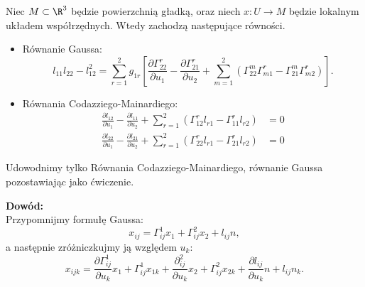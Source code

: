 \begin{frame}[<+->]


\begin{twierdzenie}\label{thm:Gauss-Codazz-Mainard}
Niec $M\subset \R^3$ będzie powierzchnią gładką, oraz niech $x\colon U\to M$ będzie lokalnym układem współrzędnych. Wtedy zachodzą następujące równości.
\begin{itemize}
\item Równanie Gaussa:
\begin{equation*}
l_{11}l_{22}-l_{12}^2=
\sum_{r=1}^{2}g_{1r}
\left[
\frac{\partial \Gamma^r_{22}} {\partial u_{1}}- \frac{\partial\Gamma ^r_{21}}{\partial u_{2}}+
\sum_{m=1}^2 \left(\Gamma^m_{22}\Gamma^r_{m1}-\Gamma^m_{21}\Gamma^r_{m2}\right)\right].
\end{equation*}

\item Równania Codazziego-Mainardiego:
\begin{align*}
\frac{\partial l_{12}}{\partial u_1}-\frac{\partial l_{11}}{\partial u_2} + 
\sum_{r=1}^2 \left( \Gamma^r_{12}l_{r1}-\Gamma^r_{11}l_{r2}\right)&=0\\
\frac{\partial l_{22}}{\partial u_1}-\frac{\partial l_{21}}{\partial u_2} + 
\sum_{r=1}^2 \left( \Gamma^r_{22}l_{r1}-\Gamma^r_{21}l_{r2}\right)&=0
\end{align*}
\end{itemize}
\end{twierdzenie}

\end{frame}
\begin{frame}[<+->]
Udowodnimy tylko Równania Codazziego-Mainardiego, równanie Gaussa pozostawiając jako ćwiczenie.

\pause {}

\pause \textcolor{ared}{\textbf{Dowód: }}\\
Przypomnijmy formułę Gaussa:
\[x_{ij}=\Gamma^1_{ij}x_1+\Gamma^2_{ij}x_2+l_{ij}n,\]\pause
a następnie zróżniczkujmy ją względem $u_k$:
\[x_{ijk}=\frac{\partial \Gamma^1_{ij}}{\partial u_k}x_1+ \Gamma^1_{ij}x_{1k}+ \frac{\partial^2_{ij}}{\partial u_k}x_2 +\Gamma^2_{ij}x_{2k} +\frac{\partial l_{ij}}{\partial u_k}n+l_{ij}n_k.\]

\end{frame}
